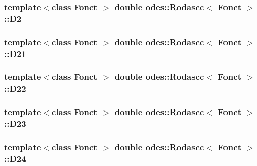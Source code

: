 \hypertarget{classodes_1_1Rodascc_a7b8abfea348d8f824591aa9d829af2cb}{
\subsubsection[{D2}]{\setlength{\rightskip}{0pt plus 5cm}template$<$class Fonct $>$ double {\bf odes\-::\-Rodascc}$<$ Fonct $>$\-::D2\hspace{0.3cm}{\ttfamily [private]}}}\label{classodes_1_1Rodascc_a7b8abfea348d8f824591aa9d829af2cb}
\hypertarget{classodes_1_1Rodascc_a4eb250d16d835b27fbf64fec23317093}{
\subsubsection[{D21}]{\setlength{\rightskip}{0pt plus 5cm}template$<$class Fonct $>$ double {\bf odes\-::\-Rodascc}$<$ Fonct $>$\-::D21\hspace{0.3cm}{\ttfamily [private]}}}\label{classodes_1_1Rodascc_a4eb250d16d835b27fbf64fec23317093}
\hypertarget{classodes_1_1Rodascc_a56614840870acaa525a3531ab1439bba}{
\subsubsection[{D22}]{\setlength{\rightskip}{0pt plus 5cm}template$<$class Fonct $>$ double {\bf odes\-::\-Rodascc}$<$ Fonct $>$\-::D22\hspace{0.3cm}{\ttfamily [private]}}}\label{classodes_1_1Rodascc_a56614840870acaa525a3531ab1439bba}
\hypertarget{classodes_1_1Rodascc_a910f05ec8b8fa2b56d57ba18b236e0b6}{
\subsubsection[{D23}]{\setlength{\rightskip}{0pt plus 5cm}template$<$class Fonct $>$ double {\bf odes\-::\-Rodascc}$<$ Fonct $>$\-::D23\hspace{0.3cm}{\ttfamily [private]}}}\label{classodes_1_1Rodascc_a910f05ec8b8fa2b56d57ba18b236e0b6}
\hypertarget{classodes_1_1Rodascc_ac65390d2e20884c00af355c855705b13}{
\subsubsection[{D24}]{\setlength{\rightskip}{0pt plus 5cm}template$<$class Fonct $>$ double {\bf odes\-::\-Rodascc}$<$ Fonct $>$\-::D24\hspace{0.3cm}{\ttfamily [private]}}}\label{classodes_1_1Rodascc_ac65390d2e20884c00af355c855705b13}
